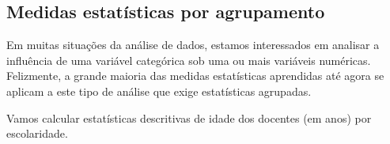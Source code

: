 \documentclass[12pt,]{style/krantz}
\makeatletter
\newenvironment{Shaded}{\begin{snugshade}}{\end{snugshade}}
\newcommand{\CommentTok}[1]{\textcolor[rgb]{0.56,0.35,0.01}{\textit{#1}}}
\newcommand{\DataTypeTok}[1]{\textcolor[rgb]{0.13,0.29,0.53}{#1}}
\newcommand{\DecValTok}[1]{\textcolor[rgb]{0.00,0.00,0.81}{#1}}
\newcommand{\FloatTok}[1]{\textcolor[rgb]{0.00,0.00,0.81}{#1}}
\newcommand{\KeywordTok}[1]{\textcolor[rgb]{0.13,0.29,0.53}{\textbf{#1}}}
\newcommand{\NormalTok}[1]{#1}
\newcommand{\OperatorTok}[1]{\textcolor[rgb]{0.81,0.36,0.00}{\textbf{#1}}}
\newcommand{\OtherTok}[1]{\textcolor[rgb]{0.56,0.35,0.01}{#1}}
\newcommand{\StringTok}[1]{\textcolor[rgb]{0.31,0.60,0.02}{#1}}
\newenvironment{kframe}{%
\medskip{}
\setlength{\fboxsep}{.8em}
 \def\at@end@of@kframe{}%
 \ifinner\ifhmode%
  \def\at@end@of@kframe{\end{minipage}}%
  \begin{minipage}{\columnwidth}%
 \fi\fi%
 \def\FrameCommand##1{\hskip\@totalleftmargin \hskip-\fboxsep
 \colorbox{shadecolor}{##1}\hskip-\fboxsep
     \hskip-\linewidth \hskip-\@totalleftmargin \hskip\columnwidth}%
 \MakeFramed {\advance\hsize-\width
   \@totalleftmargin\z@ \linewidth\hsize
   \@setminipage}}%
 {\par\unskip\endMakeFramed%
 \at@end@of@kframe}
\renewenvironment{Shaded}{\begin{kframe}}{\end{kframe}}
\theoremstyle{definition}
\theoremstyle{definition}
\theoremstyle{definition}
\theoremstyle{remark}
\let\BeginKnitrBlock\begin \let\EndKnitrBlock\end
\makeatother
\begin{document}
\hypertarget{medidas-estatisticas-por-agrupamento}{%
\subsection{Medidas estatísticas por agrupamento}\label{medidas-estatisticas-por-agrupamento}}

Em muitas situações da análise de dados, estamos interessados em analisar a influência de uma variável categórica sob uma ou mais variáveis numéricas. Felizmente, a grande maioria das medidas estatísticas aprendidas até agora se aplicam a este tipo de análise que exige estatísticas agrupadas.

\BeginKnitrBlock{example}
\protect\hypertarget{exm:unnamed-chunk-60}{}{\label{exm:unnamed-chunk-60} }Vamos calcular estatísticas descritivas de idade dos docentes (em anos) por escolaridade.
\EndKnitrBlock{example}

\begin{Shaded}
\end{Shaded}
\end{document}
